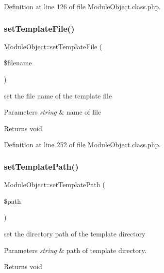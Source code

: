 Definition at line 126 of file Module\+Object.\+class.\+php.

\hypertarget{classModuleObject_aa38e116023d54d3f5d8f507bb87663f4}{}\label{classModuleObject_aa38e116023d54d3f5d8f507bb87663f4} 
\subsubsection{\texorpdfstring{set\+Template\+File()}{setTemplateFile()}}
{\footnotesize\ttfamily Module\+Object\+::set\+Template\+File (\begin{DoxyParamCaption}\item[{}]{\$filename }\end{DoxyParamCaption})}

set the file name of the template file 
\begin{DoxyParams}{Parameters}
{\em string} & name of file \\
\hline
\end{DoxyParams}
\begin{DoxyReturn}{Returns}
void 
\end{DoxyReturn}


Definition at line 252 of file Module\+Object.\+class.\+php.

\hypertarget{classModuleObject_a440407bd8b6b16eb03115ad4a5c5835a}{}\label{classModuleObject_a440407bd8b6b16eb03115ad4a5c5835a} 
\subsubsection{\texorpdfstring{set\+Template\+Path()}{setTemplatePath()}}
{\footnotesize\ttfamily Module\+Object\+::set\+Template\+Path (\begin{DoxyParamCaption}\item[{}]{\$path }\end{DoxyParamCaption})}

set the directory path of the template directory 
\begin{DoxyParams}{Parameters}
{\em string} & path of template directory. \\
\hline
\end{DoxyParams}
\begin{DoxyReturn}{Returns}
void 
\end{DoxyReturn}


